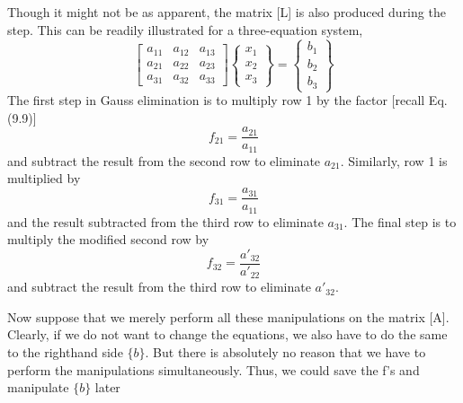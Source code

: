 \documentclass[../main.tex]{subfiles}
\begin{document}
Though it might not be as apparent, the matrix [L] is also produced during the step. This can be readily illustrated for a three-equation system,
\begin{equation}
\begin{bmatrix}
a_{11} &a_{12}  &a_{13} \\
a_{21} &a_{22}  &a_{23} \\
a_{31} &a_{32}  &a_{33}
\end{bmatrix}
\begin{Bmatrix}
x_{1}\\
x_{2}\\
x_{3}
\end{Bmatrix}=
\begin{Bmatrix}
b_{1}\\
b_{2}\\
b_{3}
\end{Bmatrix}
\end{equation}
The first step in Gauss elimination is to multiply row 1 by the factor [recall Eq. (9.9)]
\begin{equation}
f_{21}=\frac{a_{21}}{a_{11}}
\end{equation}
and subtract the result from the second row to eliminate $a_{21}$. Similarly, row 1 is multiplied by
\begin{equation}
f_{31}=\frac{a_{31}}{a_{11}}
\end{equation}
and the result subtracted from the third row to eliminate $a_{31}$. The final step is to multiply the modified second row by
\begin{equation}
f_{32}=\frac{a'_{32}}{a'_{22}}
\end{equation}
and subtract the result from the third row to eliminate $a'_{32}$.

Now suppose that we merely perform all these manipulations on the matrix [A]. Clearly, if we do not want to change the equations, we also have to do the same to the righthand side $\{b\}$. But there is absolutely no reason that we have to perform the manipulations simultaneously. Thus, we could save the f’s and manipulate $\{b\}$ later
\end{document}
